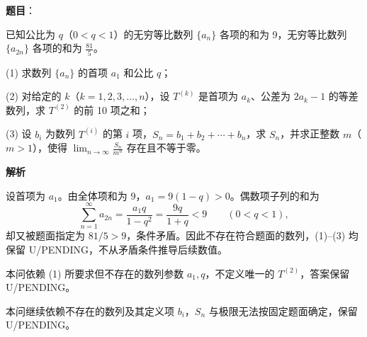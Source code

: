 \begin{answer}

\textbf{题目}：

已知公比为 \(q\)（\(0<q<1\)）的无穷等比数列 \(\{a_n\}\) 各项的和为 9，无穷等比数列 \(\{a_{2n}\}\) 各项的和为 \(\frac{81}{5}\)。

(1) 求数列 \(\{a_n\}\) 的首项 \(a_1\) 和公比 \(q\)；

(2) 对给定的 \(k\)（\(k=1,2,3,\ldots,n\)），设 \(T^{(k)}\) 是首项为 \(a_k\)、公差为 \(2a_k-1\) 的等差数列，求 \(T^{(2)}\) 的前 10 项之和；

(3) 设 \(b_i\) 为数列 \(T^{(i)}\) 的第 \(i\) 项，\(S_n=b_1+b_2+\cdots+b_n\)，求 \(S_n\)，并求正整数 \(m\)（\(m>1\)），使得 \(\displaystyle\lim_{n\to\infty}\frac{S_n}{m^n}\) 存在且不等于零。

\textbf{解析}


设首项为 $a_1$。由全体项和为 $9$，$a_1=9(1-q)>0$。偶数项子列的和为
\nopagebreak[4]
\[
\sum_{n=1}^{\infty}a_{2n}=\frac{a_1q}{1-q^2}=\frac{9q}{1+q}<9\qquad(0<q<1),
\]
却又被题面指定为 $81/5>9$，条件矛盾。因此不存在符合题面的数列，(1)–(3) 均保留 U/PENDING，不从矛盾条件推导后续数值。


本问依赖 (1) 所要求但不存在的数列参数 $a_1,q$，不定义唯一的 $T^{(2)}$，答案保留 U/PENDING。


本问继续依赖不存在的数列及其定义项 $b_i$，$S_n$ 与极限无法按固定题面确定，保留 U/PENDING。




\end{answer}
